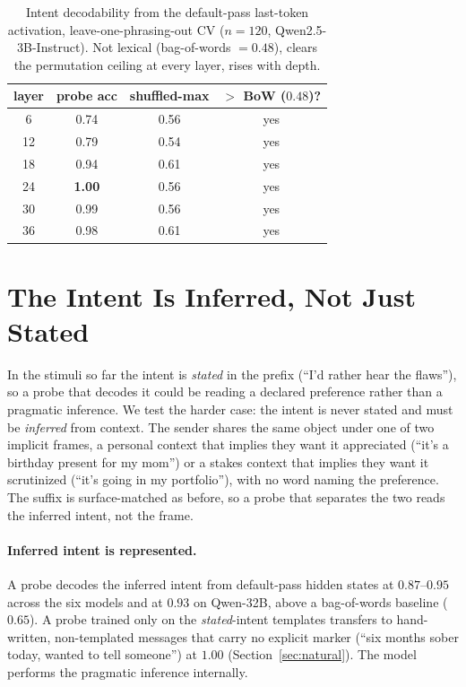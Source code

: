 \documentclass[11pt]{article}
\begin{document}
\begin{table}[t]
\centering\small
\begin{tabular}{cccc}
\toprule
layer & probe acc & shuffled-max & $>$ BoW ($0.48$)? \\
\midrule
6  & 0.74 & 0.56 & yes \\
12 & 0.79 & 0.54 & yes \\
18 & 0.94 & 0.61 & yes \\
24 & \textbf{1.00} & 0.56 & yes \\
30 & 0.99 & 0.56 & yes \\
36 & 0.98 & 0.61 & yes \\
\bottomrule
\end{tabular}
\caption{Intent decodability from the default-pass last-token activation, leave-one-phrasing-out CV
($n{=}120$, Qwen2.5-3B-Instruct). Not lexical (bag-of-words $=0.48$), clears the permutation ceiling at every
layer, rises with depth.}
\label{tab:probe}
\end{table}

\section{The Intent Is Inferred, Not Just Stated}
\label{sec:inferred}
In the stimuli so far the intent is \emph{stated} in the prefix (``I'd rather hear the flaws''), so a probe
that decodes it could be reading a declared preference rather than a pragmatic inference. We test the harder
case: the intent is never stated and must be \emph{inferred} from context. The sender shares the same object
under one of two implicit frames, a personal context that implies they want it appreciated (``it's a birthday
present for my mom'') or a stakes context that implies they want it scrutinized (``it's going in my
portfolio''), with no word naming the preference. The suffix is surface-matched as before, so a probe that
separates the two reads the inferred intent, not the frame.

\paragraph{Inferred intent is represented.} A probe decodes the inferred intent from default-pass hidden
states at $0.87$--$0.95$ across the six models and at $0.93$ on Qwen-32B, above a bag-of-words baseline
($0.65$). A probe trained only on the \emph{stated}-intent templates transfers to hand-written, non-templated
messages that carry no explicit marker (``six months sober today, wanted to tell someone'') at $1.00$
(Section~\ref{sec:natural}). The model performs the pragmatic inference internally.
\end{document}
